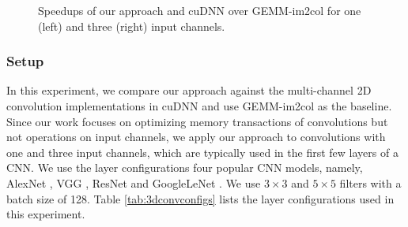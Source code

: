 \begin{figure}
\centering
	
\vspace{-2mm}
\caption{Speedups of our approach and cuDNN over GEMM-im2col for one (left) and three (right) input channels.} \label{fig:multi2druntime}
\vspace{-2mm}
\end{figure}


\subsubsection{Setup} In this experiment, we compare our approach against the multi-channel 2D convolution implementations in cuDNN and use GEMM-im2col as the baseline. Since our work focuses on optimizing memory transactions of convolutions but not operations on input channels, we apply our approach to convolutions with one and three input channels, which are typically used in the first few layers of a CNN. We use the layer configurations four popular CNN models,
namely, AlexNet \cite{Krizhevsky2012ImageNet}, VGG \cite{SimonyanZ14a}, ResNet \cite{HeZRS16} and GoogleLeNet \cite{SzegedyLJSRAEVR15}. We
use $3 \times 3$ and $5 \times 5$ filters with a batch size of 128. Table \ref{tab:3dconvconfigs} lists the layer configurations used in
this experiment.


